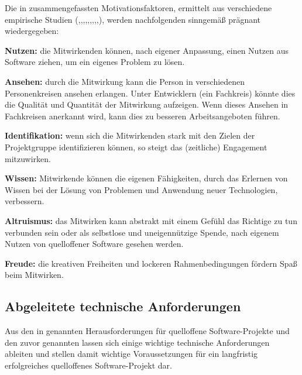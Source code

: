 Die in  zusammengefassten Motivationsfaktoren, ermittelt aus verschiedene empirische Studien (,,,,,,,,,), werden nachfolgenden sinngemäß prägnant wiedergegeben:
\begin{inparaenum}[\bfseries(a)]
    \item \textbf{Nutzen:} die Mitwirkenden können, \insb nach eigener Anpassung, einen Nutzen aus Software ziehen, um \zB ein eigenes Problem zu lösen.
    \item \textbf{Ansehen:} durch die Mitwirkung kann die Person in verschiedenen Personenkreisen ansehen erlangen.
    Unter Entwicklern (ein Fachkreis) könnte dies \zB die Qualität und Quantität der Mitwirkung aufzeigen.
    Wenn dieses Ansehen in Fachkreisen anerkannt wird, kann dies \zB zu besseren Arbeitsangeboten führen.
    \item \textbf{Identifikation:} wenn sich die Mitwirkenden stark mit den Zielen der Projektgruppe identifizieren können, so steigt das (zeitliche) Engagement mitzuwirken.
    \item \textbf{Wissen:} Mitwirkende können die eigenen Fähigkeiten, durch das Erlernen von Wissen bei der Lösung von Problemen und Anwendung neuer Technologien, verbessern.
    \item \textbf{Altruismus:} das Mitwirken kann abstrakt mit einem Gefühl das Richtige zu tun verbunden sein oder als selbstlose und uneigennützige Spende, nach eigenem Nutzen von quelloffener Software gesehen werden.
    \item \textbf{Freude:} die kreativen Freiheiten und lockeren Rahmenbedingungen fördern Spaß beim Mitwirken.
\end{inparaenum}


\subsection{Abgeleitete technische Anforderungen}\label{subsec:abgeleitete-technische-anforderungen}

Aus den in  genannten Herausforderungen für quelloffene Software-Projekte und den zuvor genannten  lassen sich einige wichtige technische Anforderungen ableiten und stellen damit wichtige Voraussetzungen für ein langfristig erfolgreiches quelloffenes Software-Projekt dar.

